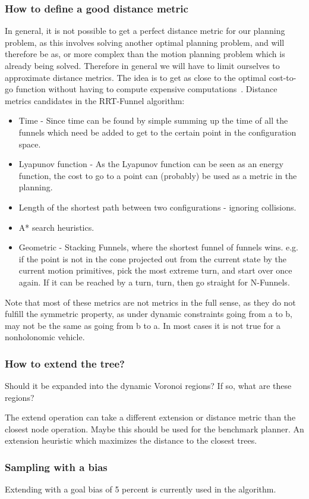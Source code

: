 \subsubsection{How to define a good distance metric}
In general, it is not possible to get a perfect distance metric for our planning
problem, as this involves solving another optimal planning problem, and will
therefore be as, or more complex than the motion planning problem which is
already being solved. Therefore in general we will have to limit ourselves to
approximate distance metrics. The idea is to get as close to the optimal
cost-to-go function without having to compute expensive
computations~\cite{Lav06}. Distance metrics candidates in the RRT-Funnel
algorithm:
\begin{itemize}
\item Time - Since time can be found by simple summing up the time of all the
  funnels which need be added to get to the certain point in the configuration
  space.
\item Lyapunov function - As the Lyapunov function can be seen as an energy
  function, the cost to go to a point can (probably) be used as a metric in the
  planning.
\item Length of the shortest path between two configurations - ignoring
  collisions.
\item A* search heuristics.
\item Geometric - Stacking Funnels, where the shortest funnel of funnels wins.
  e.g. if the point is not in the cone projected out from the current state by
  the current motion primitives, pick the most extreme turn, and start over once
  again. If it can be reached by a turn, turn, then go straight for N-Funnels.
\end{itemize}

Note that most of these metrics are not metrics in the full sense, as they do
not fulfill the symmetric property, as under dynamic constraints going from a to
b, may not be the same as going from b to a. In most cases it is not true for a
nonholonomic vehicle.

\subsubsection{How to extend the tree?}

Should it be expanded into the dynamic Voronoi regions? If so, what are these
regions?

The extend operation can take a different extension or distance metric than the
closest node operation. Maybe this should be used for the benchmark planner. An
extension heuristic which maximizes the distance to the closest trees.

\subsubsection{Sampling with a bias}

Extending with a goal bias of 5 percent is currently used in the \rrtfunnel{}
algorithm. 